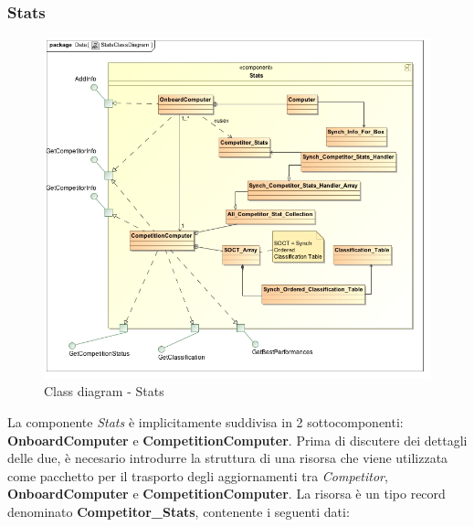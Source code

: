 \subsubsection{Stats}
\begin{center}
\begin{figure}[h!]
	\includegraphics[scale=0.50]{img/ClassDiagrams/StatsClassDiagram.jpg}
\caption{Class diagram - Stats}
\end{figure}
\end{center}
La componente \emph{Stats} \`{e} implicitamente suddivisa in 2 sottocomponenti: \textbf{OnboardComputer} e \textbf{CompetitionComputer}. 
Prima di discutere dei dettagli delle due, \`{e} necesario introdurre la struttura di una risorsa che viene utilizzata come
pacchetto per il trasporto degli aggiornamenti tra \emph{Competitor}, \textbf{OnboardComputer} e \textbf{CompetitionComputer}. La risorsa \`{e} 
un tipo record denominato \textbf{Competitor\_Stats}, contenente i seguenti dati:
